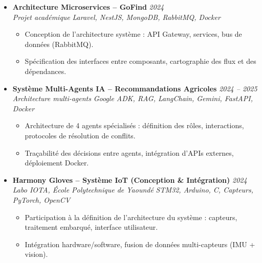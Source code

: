 \documentclass[a4paper,11pt]{article}
\begin{document}
\begin{itemize}[leftmargin=*, label={-}]
\item \textbf{Architecture Microservices -- GoFind} \hfill \textit{2024} \\
\textit{Projet académique} \hfill \textit{Laravel, NestJS, MongoDB, RabbitMQ, Docker}
\vspace{-2pt}
    \begin{itemize}[leftmargin=0.4cm, nosep, label=\tiny$\bullet$]
        \item \small{Conception de l'architecture système : API Gateway, services, bus de données (RabbitMQ).}
        \item \small{Spécification des interfaces entre composants, cartographie des flux et des dépendances.}
    \end{itemize}
\vspace{3pt}

\item \textbf{Système Multi-Agents IA -- Recommandations Agricoles} \hfill \textit{2024 -- 2025} \\
\textit{Architecture multi-agents} \hfill \textit{Google ADK, RAG, LangChain, Gemini, FastAPI, Docker}
\vspace{-2pt}
    \begin{itemize}[leftmargin=0.4cm, nosep, label=\tiny$\bullet$]
        \item \small{Architecture de 4 agents spécialisés : définition des rôles, interactions, protocoles de résolution de conflits.}
        \item \small{Traçabilité des décisions entre agents, intégration d'APIs externes, déploiement Docker.}
    \end{itemize}
\vspace{3pt}

\item \textbf{Harmony Gloves -- Système IoT (Conception \& Intégration)} \hfill \textit{2024} \\
\textit{Labo IOTA, École Polytechnique de Yaoundé} \hfill \textit{STM32, Arduino, C, Capteurs, PyTorch, OpenCV}
\vspace{-2pt}
    \begin{itemize}[leftmargin=0.4cm, nosep, label=\tiny$\bullet$]
        \item \small{Participation à la définition de l'architecture du système : capteurs, traitement embarqué, interface utilisateur.}
        \item \small{Intégration hardware/software, fusion de données multi-capteurs (IMU + vision).}
    \end{itemize}
\vspace{3pt}

\end{itemize}
\end{document}
